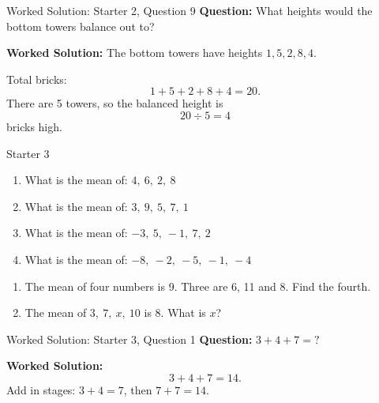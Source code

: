 \documentclass{beamer}
\newcommand{\ashow}[1]{\uncover<2->{\textcolor{red}{\small #1}}}
\newcommand{\ashowq}[1]{\alt<2->{\textcolor{red}{\small #1}}{?}}
\begin{document}
\begin{frame}{Worked Solution: Starter 2, Question 9}
\textbf{Question:} What heights would the bottom towers balance out to?

\textbf{Worked Solution:}
The bottom towers have heights \(1, 5, 2, 8, 4\).

Total bricks:
\[
1 + 5 + 2 + 8 + 4 = 20.
\]
There are 5 towers, so the balanced height is
\[
20 \div 5 = 4
\]
bricks high.
\end{frame}

\begin{frame}{Starter 3}
\hypertarget{q-st3}{}
\vspace{-0.8em}

\footnotesize
\vspace{0.2em}
\begin{enumerate}\itemsep1pt
  \vspace{-1em}
  \item What is the mean of: $4,\ 6,\ 2,\ 8$ \ashow{5}
  \item What is the mean  of: $3,\ 9,\ 5,\ 7,\ 1$ \ashow{5}
  \item What is the mean  of: $-3,\ 5,\ -1,\ 7,\ 2$ \ashow{2}
  \item What is the mean  of: $-8,\ -2,\ -5,\ -1,\ -4$ \ashow{$-4$}
\end{enumerate}

\begin{enumerate}\itemsep1pt
  \setcounter{enumi}8
  \item The mean of four numbers is 9. Three are 6, 11 and 8. Find the fourth. \ashow{11}
  \item The mean of $3,\ 7,\ x,\ 10$ is $8$. What is $x$? \ashow{12}
\end{enumerate}


\end{frame}

\begin{frame}{Worked Solution: Starter 3, Question 1}
\hypertarget{work-st3}{}
\textbf{Question:} \(3 + 4 + 7 = ?\)

\textbf{Worked Solution:}
\[
3 + 4 + 7 = 14.
\]
Add in stages: \(3 + 4 = 7\), then \(7 + 7 = 14\).
\end{frame}
\end{document}
